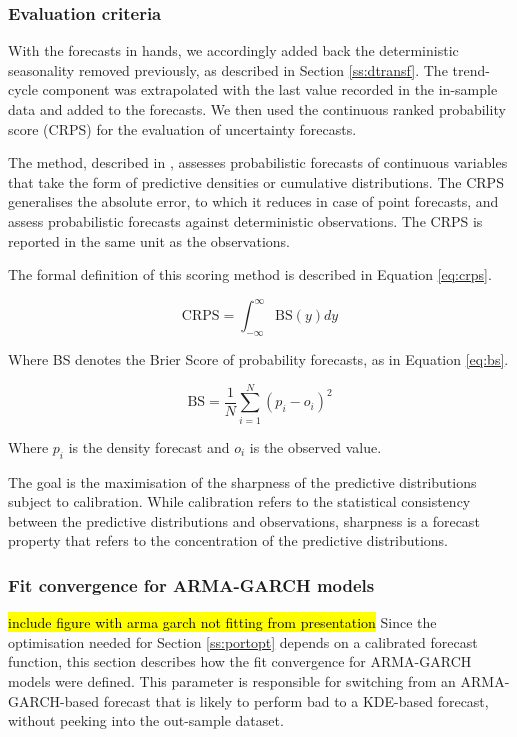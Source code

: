 \documentclass[preprint,3p,12pt,authoryear]{elsarticle}
\begin{document}
\subsubsection{Evaluation criteria}
\label{sss:eval}
With the forecasts in hands, we accordingly added back the deterministic seasonality removed previously, as described in Section \ref{ss:dtransf}.
The trend-cycle component was extrapolated with the last value recorded in the in-sample data and added to the forecasts.
We then used the continuous ranked probability score (CRPS) for the evaluation of uncertainty forecasts.

The method, described in \citet{GBR2007crps}, assesses probabilistic forecasts of continuous variables that take the form of predictive densities or cumulative distributions.
The CRPS generalises the absolute error, to which it reduces in case of point forecasts, and assess probabilistic forecasts against deterministic observations.
The CRPS is reported in the same unit as the observations.

The formal definition of this scoring method is described in Equation \ref{eq:crps}.

\begin{equation}
   \text{CRPS} = \int_{-\infty}^{\infty} \text{BS}(y) dy
   \label{eq:crps}
\end{equation}

Where BS denotes the Brier Score \citep{brier1950verification} of probability forecasts, as in Equation \ref{eq:bs}.

\begin{equation}
   \text{BS} = \frac{1}{N} \sum_{i=1}^N {(p_i - o_i)}^2
   \label{eq:bs}
\end{equation}

Where $p_i$ is the density forecast and $o_i$ is the observed value.

The goal is the maximisation of the sharpness of the predictive distributions subject to calibration.
While calibration refers to the statistical consistency between the predictive distributions and observations, sharpness is a forecast property that refers to the concentration of the predictive distributions.

\subsubsection{Fit convergence for ARMA-GARCH models}
\label{sss:gof.min}
\hl{include figure with arma garch not fitting from presentation}
Since the optimisation needed for Section \ref{ss:portopt} depends on a calibrated forecast function, this section describes how the fit convergence for ARMA-GARCH models were defined.
This parameter is responsible for switching from an ARMA-GARCH-based forecast that is likely to perform bad to a KDE-based forecast, without peeking into the out-sample dataset.
\end{document}
